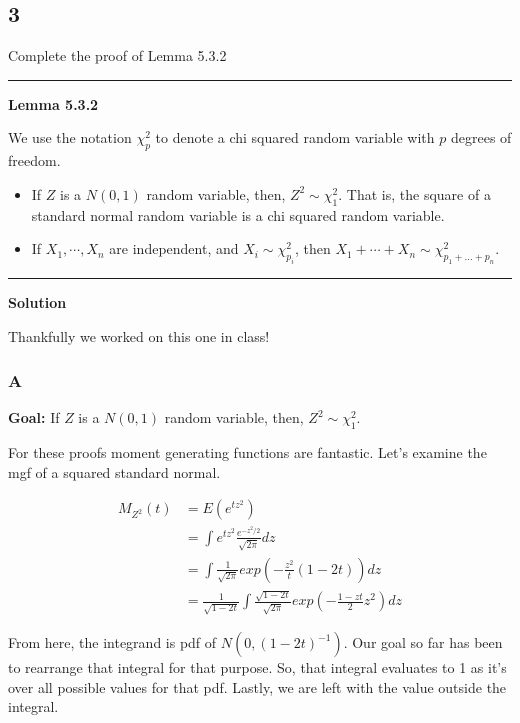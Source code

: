 \subsection*{3}

Complete the proof of Lemma 5.3.2


\vspace{0.75em}
\hrule
\vspace{0.75em}
\noindent\textbf{Lemma 5.3.2}

We use the notation $\chi^2_p$ to denote a chi squared random variable with $p$ degrees of freedom. 

\begin{itemize}
\item If $Z$ is a $N(0,1)$ random variable, then, $Z^2 \sim \chi^2_1$. That is, the square of a standard normal random variable is a chi squared random variable.

\item If $X_1, \cdots, X_n$ are independent, and $X_i \sim \chi^2_{p_i}$, then $X_1 + \cdots + X_n \sim \chi^2_{p_1 + \ldots + p_n}$.
\end{itemize}
\hrule
\vspace{0.75em}

\noindent\textbf{Solution}

Thankfully we worked on this one in class!

\subsubsection*{A}
\noindent\textbf{Goal:} If $Z$ is a $N(0,1)$ random variable, then, $Z^2 \sim \chi^2_1$.

For these proofs moment generating functions are fantastic. Let's examine the mgf of a squared standard normal.

\begin{align*}
	M_{Z^2}(t) &= E(e^{tz^2}) \\
	&= \int e^{tz^2} \frac{e^{-z^2/2}}{\sqrt{2\pi}} dz \\
	&= \int \frac{1}{\sqrt{2\pi}} exp\left( -\frac{z^2}{t} (1-2t) \right) dz \\
	&= \frac{1}{\sqrt{1-2t}} \int \frac{\sqrt{1-2t}}{\sqrt{2\pi}} exp\left( -\frac{1-zt}{2} z^2 \right) dz 
\end{align*}

From here, the integrand is pdf of $N(0, (1-2t)^{-1})$. Our goal so far has been to rearrange that integral for that purpose. So, that integral evaluates to 1 as it's over all possible values for that pdf. Lastly, we are left with the value outside the integral.

